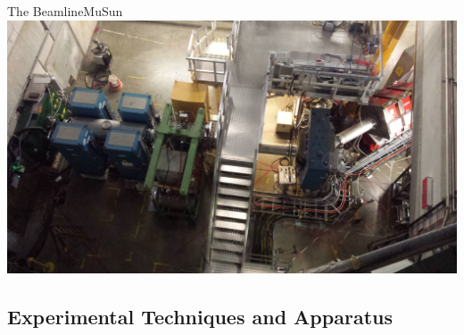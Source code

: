 \documentclass{beamer}
\begin{document}
\begin{frame}{The Beamline}{MuSun}
  \includegraphics[width=\textwidth]{figures/beamline.jpg} \\
\end{frame}


\subsection{Experimental Techniques and Apparatus}
\end{document}
